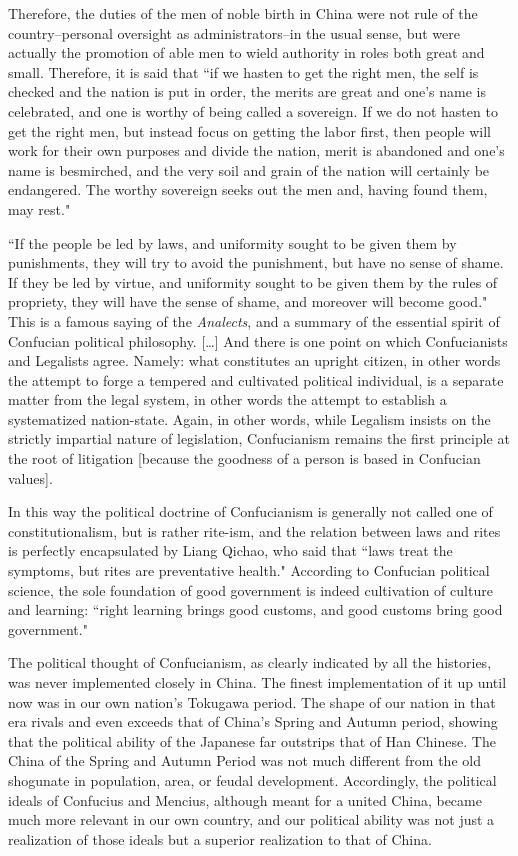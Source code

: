 Therefore, the duties of the men of noble birth in China were not rule of the country–personal oversight as administrators–in the usual sense, but were actually the promotion of able men to wield authority in roles both great and small. Therefore, it is said that ``if we hasten to get the right men, the self is checked and the nation is put in order, the merits are great and one's name is celebrated, and one is worthy of being called a sovereign. If we do not hasten to get the right men, but instead focus on getting the labor first, then people will work for their own purposes and divide the nation, merit is abandoned and one's name is besmirched, and the very soil and grain of the nation will certainly be endangered. The worthy sovereign seeks out the men and, having found them, may rest."

``If the people be led by laws, and uniformity sought to be given them by punishments, they will try to avoid the punishment, but have no sense of shame. If they be led by virtue, and uniformity sought to be given them by the rules of propriety, they will have the sense of shame, and moreover will become good." This is a famous saying of the \emph{Analects}, and a summary of the essential spirit of Confucian political philosophy. […] And there is one point on which Confucianists and Legalists agree. Namely: what constitutes an upright citizen, in other words the attempt to forge a tempered and cultivated political individual, is a separate matter from the legal system, in other words the attempt to establish a systematized nation-state. Again, in other words, while Legalism insists on the strictly impartial nature of legislation, Confucianism remains the first principle at the root of litigation [because the goodness of a person is based in Confucian values].

In this way the political doctrine of Confucianism is generally not called one of constitutionalism, but is rather rite-ism, and the relation between laws and rites is perfectly encapsulated by Liang Qichao, who said that ``laws treat the symptoms, but rites are preventative health." According to Confucian political science, the sole foundation of good government is indeed cultivation of culture and learning: ``right learning brings good customs, and good customs bring good government."

The political thought of Confucianism, as clearly indicated by all the histories, was never implemented closely in China. The finest implementation of it up until now was in our own nation's Tokugawa period. The shape of our nation in that era rivals and even exceeds that of China's Spring and Autumn period, showing that the political ability of the Japanese far outstrips that of Han Chinese. The China of the Spring and Autumn Period was not much different from the old shogunate in population, area, or feudal development. Accordingly, the political ideals of Confucius and Mencius, although meant for a united China, became much more relevant in our own country, and our political ability was not just a realization of those ideals but a superior realization to that of China.

